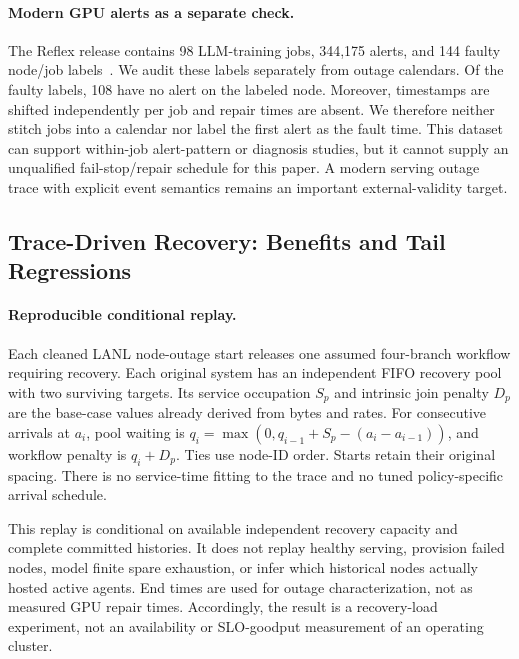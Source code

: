\documentclass[sigplan,10pt,anonymous,nonacm]{acmart}
\begin{document}
\paragraph{Modern GPU alerts as a separate check.}
The Reflex release contains 98 LLM-training jobs, 344,175 alerts, and
144 faulty node/job labels~\cite{ding2026reflex,reflexDataset}.
We audit these labels separately from outage calendars.
Of the faulty labels, 108 have no alert on the labeled node. Moreover,
timestamps are shifted independently per job and repair times are absent.
We therefore neither stitch jobs into a calendar nor label the first
alert as the fault time. This dataset can support within-job alert-pattern
or diagnosis studies, but it cannot supply an unqualified fail-stop/repair
schedule for this paper. A modern serving outage trace with explicit
event semantics remains an important external-validity target.

\FloatBarrier
\subsection{Trace-Driven Recovery: Benefits and Tail Regressions}

\paragraph{Reproducible conditional replay.}
Each cleaned LANL node-outage start releases one assumed four-branch
workflow requiring recovery. Each original system has an independent
FIFO recovery pool with two surviving targets. Its service occupation
$S_p$ and intrinsic join penalty $D_p$ are the base-case values already
derived from bytes and rates. For consecutive arrivals at $a_i$, pool
waiting is $q_i=\max(0,q_{i-1}+S_p-(a_i-a_{i-1}))$, and workflow
penalty is $q_i+D_p$. Ties use node-ID order. Starts retain their original
spacing. There is no service-time fitting to the trace and no tuned
policy-specific arrival schedule.

This replay is conditional on available independent recovery capacity
and complete committed histories. It does not replay healthy serving,
provision failed nodes, model finite spare exhaustion, or infer which
historical nodes actually hosted active agents. End times are used for
outage characterization, not as measured GPU repair times. Accordingly,
the result is a recovery-load experiment, not an availability or SLO-goodput
measurement of an operating cluster.
\end{document}
